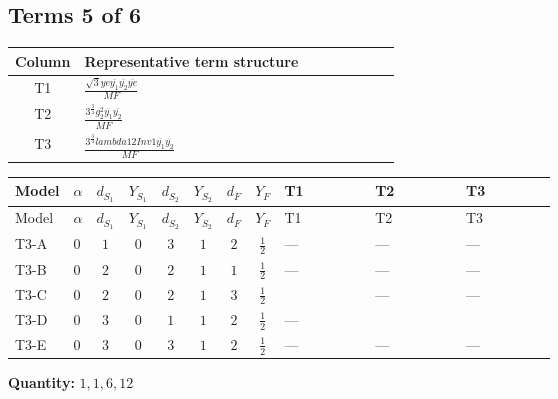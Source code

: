 \documentclass[8pt]{article}
\begin{document}
\begin{landscape}
\subsection*{Terms 5 of 6}
\begin{center}
\begin{tabular}{@{}c >{\raggedright\arraybackslash}p{0.82\linewidth}@{}}
\toprule
Column & Representative term structure \\
\midrule
T1 & \(\displaystyle \frac{\sqrt{3} ye \overline{y_{1}} \overline{y_{2}} \overline{ye}}{MF}\) \\
\midrule
T2 & \(\displaystyle \frac{3^{\frac{3}{4}} g_{2}^{2} \overline{y_{1}} \overline{y_{2}}}{MF}\) \\
\midrule
T3 & \(\displaystyle \frac{3^{\frac{3}{4}} lambda12Inv1 \overline{y_{1}} \overline{y_{2}}}{MF}\) \\
\midrule
\bottomrule
\end{tabular}
\end{center}
\smallskip
\tiny
\begin{longtable}{@{}llcccccc >{\raggedright\arraybackslash}p{0.21\linewidth} >{\raggedright\arraybackslash}p{0.21\linewidth} >{\raggedright\arraybackslash}p{0.21\linewidth}@{}}
\toprule
Model & $\alpha$ & $d_{S_1}$ & $Y_{S_1}$ & $d_{S_2}$ & $Y_{S_2}$ & $d_F$ & $Y_F$ & T1 & T2 & T3 \\
\midrule
\endfirsthead
\toprule
Model & $\alpha$ & $d_{S_1}$ & $Y_{S_1}$ & $d_{S_2}$ & $Y_{S_2}$ & $d_F$ & $Y_F$ & T1 & T2 & T3 \\
\midrule
\endhead
T3-A & $0$ & $1$ & $0$ & $3$ & $1$ & $2$ & $\frac{1}{2}$ & --- & --- & --- \\
\midrule
T3-B & $0$ & $2$ & $0$ & $2$ & $1$ & $1$ & $\frac{1}{2}$ & --- & --- & --- \\
\midrule
T3-C & $0$ & $2$ & $0$ & $2$ & $1$ & $3$ & $\frac{1}{2}$ & \scriptsize\adjustbox{max width=\linewidth}{$\begin{gathered} - \frac{\sqrt{3} ye \overline{y_{1}} \overline{y_{2}} \overline{ye}}{12 MF}\end{gathered}$} & --- & --- \\
\midrule
T3-D & $0$ & $3$ & $0$ & $1$ & $1$ & $2$ & $\frac{1}{2}$ & --- & \scriptsize\adjustbox{max width=\linewidth}{$\begin{gathered} - \frac{17 \cdot 3^{\frac{3}{4}} g_{2}^{2} \overline{y_{1}} \overline{y_{2}}}{24 MF}\end{gathered}$} & \scriptsize\adjustbox{max width=\linewidth}{$\begin{gathered} - \frac{3^{\frac{3}{4}} lambda12Inv1 \overline{y_{1}} \overline{y_{2}}}{6 MF}\end{gathered}$} \\
\midrule
T3-E & $0$ & $3$ & $0$ & $3$ & $1$ & $2$ & $\frac{1}{2}$ & --- & --- & --- \\
\midrule
\bottomrule
\end{longtable}
\clearpage
\noindent\textbf{Quantity: }$\mathrm{1,1,6,12}$\par\smallskip

\end{landscape}
\end{document}
